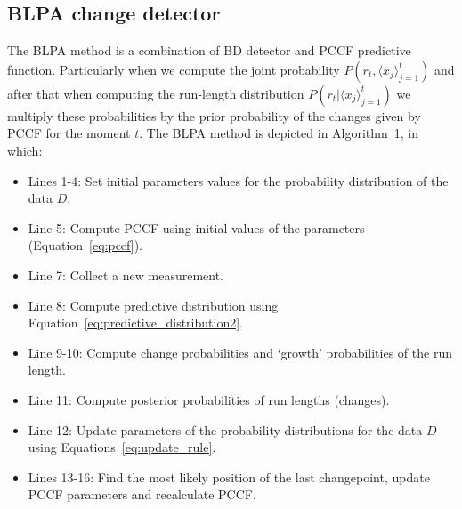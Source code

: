 \subsection{BLPA change detector}
\label{subsec:BLPA}
The BLPA method is a combination of BD detector and PCCF predictive function.
Particularly when we compute the joint probability $P(r_t, \langle x_j \rangle_{j=1}^{t})$
and after that when computing the run-length distribution
$P(r_t | \langle x_j \rangle_{j=1}^{t})$
we multiply these probabilities by the prior probability of the
changes given by PCCF for the moment $t$.
The BLPA method is depicted in Algorithm~1, in which:
\begin{itemize}
    \item Lines 1-4: Set initial parameters values for the probability distribution of the data $D$.

    \item Line 5: Compute PCCF using initial values of the
        parameters (Equation~\ref{eq:pccf}).

    \item Line 7: Collect a new measurement.

    \item Line 8: Compute predictive distribution using Equation~\ref{eq:predictive_distribution2}.

    \item Line 9-10: Compute change probabilities and `growth' probabilities of the run length.

    \item Line 11: Compute posterior probabilities of run lengths (changes).

    \item Line 12: Update parameters of the probability distributions for the data $D$ using Equations~\ref{eq:update_rule}.

    \item Lines 13-16: Find the most likely position of the last changepoint, update PCCF parameters and recalculate PCCF.
\end{itemize}



